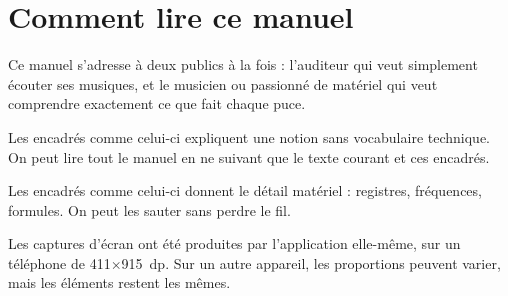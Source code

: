 \chapter*{Comment lire ce manuel}
Ce manuel s'adresse à deux publics à la fois : l'auditeur qui veut simplement écouter ses musiques, et le
musicien ou passionné de matériel qui veut comprendre exactement ce que fait chaque puce.

\begin{enclair}
Les encadrés comme celui-ci expliquent une notion sans vocabulaire technique. On peut lire tout le manuel en ne
suivant que le texte courant et ces encadrés.
\end{enclair}

\begin{technique}
Les encadrés comme celui-ci donnent le détail matériel : registres, fréquences, formules. On peut les sauter sans
perdre le fil.
\end{technique}

Les captures d'écran ont été produites par l'application elle-même, sur un téléphone de 411$\times$915~dp. Sur un
autre appareil, les proportions peuvent varier, mais les éléments restent les mêmes.
